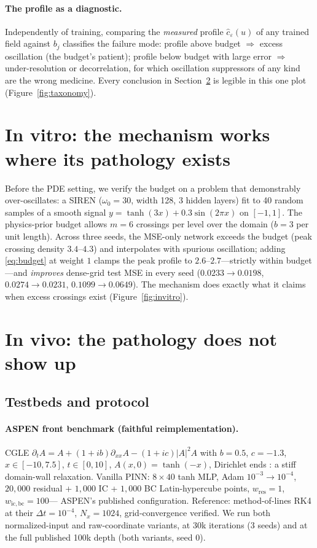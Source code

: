 \documentclass[10pt]{article}
\begin{document}
\paragraph{The profile as a diagnostic.}
\label{sec:diagnostic}
Independently of training, comparing the \emph{measured} profile
$\hat c_\varepsilon(u)$ of any trained field against $b_j$ classifies the failure
mode: profile above budget $\Rightarrow$ excess oscillation (the budget's patient);
profile below budget with large error $\Rightarrow$ under-resolution or
decorrelation, for which oscillation suppressors of any kind are the wrong medicine.
Every conclusion in Section~\ref{sec:invivo} is legible in this one plot
(Figure~\ref{fig:taxonomy}).

\section{In vitro: the mechanism works where its pathology exists}
\label{sec:invitro}

Before the PDE setting, we verify the budget on a problem that demonstrably
over-oscillates: a SIREN \citep{sitzmann2020siren} ($\omega_0{=}30$, width 128,
3 hidden layers) fit to 40 random samples of a smooth signal
$y = \tanh(3x) + 0.3\sin(2\pi x)$ on $[-1,1]$. The physics-prior budget allows
$m{=}6$ crossings per level over the domain ($b{=}3$ per unit length). Across three
seeds, the MSE-only network exceeds the budget (peak crossing density $3.4$--$4.3$)
and interpolates with spurious oscillation; adding \eqref{eq:budget} at weight $1$
clamps the peak profile to $2.6$--$2.7$---strictly within budget---and
\emph{improves} dense-grid test MSE in every seed ($0.0233\!\to\!0.0198$,
$0.0274\!\to\!0.0231$, $0.1099\!\to\!0.0649$). The mechanism does exactly what it
claims when excess crossings exist (Figure~\ref{fig:invitro}).

\section{In vivo: the pathology does not show up}
\label{sec:invivo}

\subsection{Testbeds and protocol}

\paragraph{ASPEN front benchmark (faithful reimplementation).} CGLE
$\partial_t A = A + (1+ib)\partial_{xx}A - (1+ic)|A|^2A$ with $b{=}0.5$,
$c{=}-1.3$, $x\in[-10,7.5]$, $t\in[0,10]$, $A(x,0)=\tanh(-x)$, Dirichlet ends
\citep{aspen2025}: a stiff domain-wall relaxation. Vanilla PINN: $8{\times}40$ tanh
MLP, Adam $10^{-3}\!\to\!10^{-4}$, $20{,}000$ residual + $1{,}000$ IC + $1{,}000$
BC Latin-hypercube points, $w_{\mathrm{res}}{=}1$, $w_{\mathrm{ic,bc}}{=}100$---%
ASPEN's published configuration. Reference: method-of-lines RK4 at their
$\Delta t{=}10^{-4}$, $N_x{=}1024$, grid-convergence verified. We run both
normalized-input and raw-coordinate variants, at 30k iterations (3 seeds) and at
the full published 100k depth (both variants, seed 0).
\end{document}

